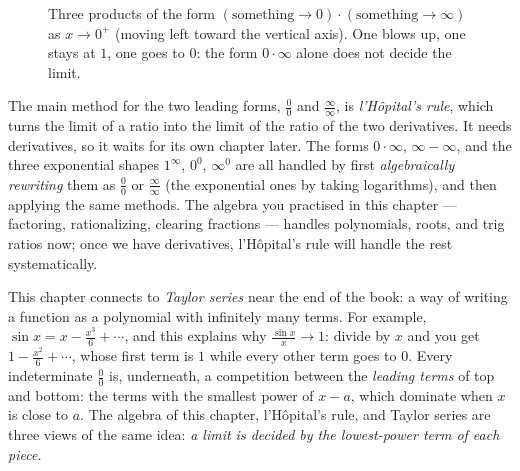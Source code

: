 \begin{figure}[htbp]
\centering
{}
\caption{Three products of the form $(\text{something}\to 0)\cdot(\text{something}\to\infty)$
as $x\to 0^{+}$ (moving left toward the vertical axis). One blows up, one stays at $1$,
one goes to $0$: the form $0\cdot\infty$ alone does not decide the limit.}
\label{ch07:fig-zerotimesinf}
\end{figure}

The main method for the two leading forms, $\frac00$ and
$\frac{\infty}{\infty}$, is \emph{l'H\^opital's rule}, which turns the limit of
a ratio into the limit of the ratio of the two derivatives. It needs
derivatives, so it waits for its own chapter later. The forms $0\cdot\infty$,
$\infty-\infty$, and the three exponential shapes $1^\infty$, $0^0$,
$\infty^0$ are all handled by first \emph{algebraically rewriting} them as
$\frac00$ or $\frac{\infty}{\infty}$ (the exponential ones by taking logarithms), and
then applying the same methods. The algebra you practised in this chapter ---
factoring, rationalizing, clearing fractions --- handles polynomials, roots, and trig ratios now;
once we have derivatives, l'H\^opital's rule will handle the rest systematically.

\begin{connectionbox}
This chapter connects to \emph{Taylor series} near
the end of the book: a way of writing a function as a polynomial with infinitely
many terms. For example, $\sin x = x -
\frac{x^3}{6} + \cdots$, and this explains why $\frac{\sin x}{x}\to 1$: divide by $x$ and you get
$1 - \frac{x^2}{6}+\cdots$, whose first term is $1$ while every other term goes to $0$.
Every indeterminate $\frac00$ is, underneath, a competition
between the \emph{leading terms} of top and bottom: the terms with the smallest power
of $x-a$, which dominate when $x$ is close to $a$. The algebra of this
chapter, l'H\^opital's rule, and Taylor series are three views of the same
idea: \emph{a limit is decided by the lowest-power term of each piece.}
\end{connectionbox}

